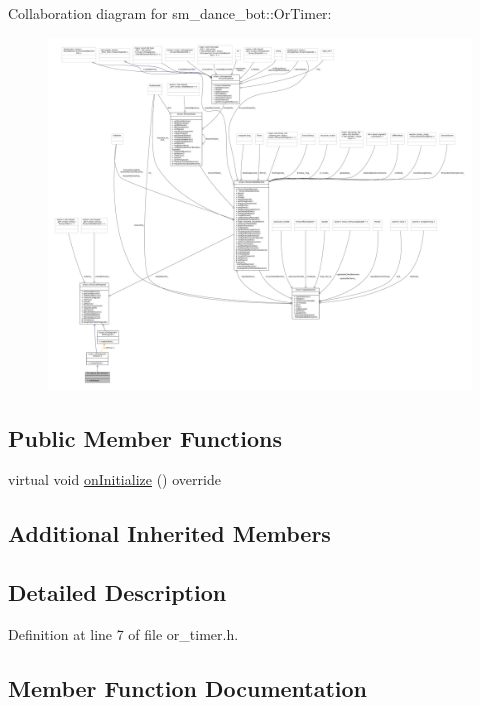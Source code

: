 Collaboration diagram for sm\+\_\+dance\+\_\+bot\+:\+:Or\+Timer\+:
\nopagebreak
\begin{figure}[H]
\begin{center}
\leavevmode
\includegraphics[width=350pt]{classsm__dance__bot_1_1OrTimer__coll__graph}
\end{center}
\end{figure}
\subsection*{Public Member Functions}
\begin{DoxyCompactItemize}
\item 
virtual void \hyperlink{classsm__dance__bot_1_1OrTimer_aa0091c17ca7ff4c71badd03085272cc4}{on\+Initialize} () override
\end{DoxyCompactItemize}
\subsection*{Additional Inherited Members}


\subsection{Detailed Description}


Definition at line 7 of file or\+\_\+timer.\+h.



\subsection{Member Function Documentation}
